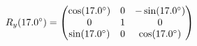 \documentclass[preview]{standalone}
\begin{document}
\begin{align*}
\special{dvisvgm:raw <g id='unique000'>}R_y(17.0^\circ) = \begin{pmatrix} \cos(17.0^\circ) & 0 & -\sin(17.0^\circ) \\ 0 & 1 & 0 \\ \sin(17.0^\circ) & 0 & \cos(17.0^\circ) \end{pmatrix}\special{dvisvgm:raw </g>}
\end{align*}
\end{document}
